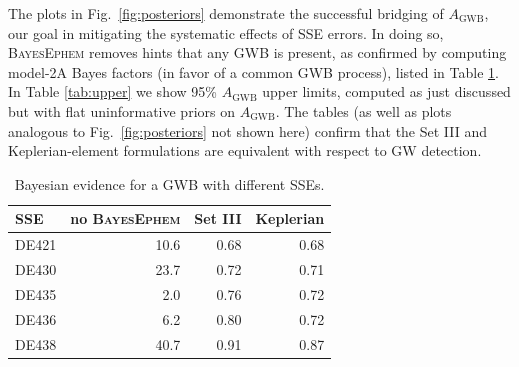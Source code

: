 \documentclass[iop,apj,twocolappendix]{emulateapj}
\begin{document}
The plots in Fig.\ \ref{fig:posteriors} demonstrate the successful bridging of $A_\mathrm{GWB}$, our goal in mitigating the systematic effects of SSE errors. In doing so, \textsc{BayesEphem} removes hints that any GWB is present, as confirmed by computing model-2A Bayes factors (in favor of a common GWB process), listed in Table \ref{tab:bf}. In Table \ref{tab:upper} we show 95\% $A_\mathrm{GWB}$ upper limits, computed as just discussed but with flat uninformative priors on $A_\mathrm{GWB}$. The tables (as well as plots analogous to Fig.\ \ref{fig:posteriors} not shown here) confirm that the Set III and Keplerian-element formulations are equivalent with respect to GW detection.
%
\begin{table}[ht]
    \begin{center}
    \caption{Bayesian evidence for a GWB with different SSEs.\label{tab:bf}} 
    \begin{tabular}{l|r|r|r}
SSE & no \textsc{BayesEphem} & Set III & Keplerian \\
\hline
DE421 & 10.6 & 0.68 & 0.68 \\
DE430 & 23.7 & 0.72 & 0.71 \\
DE435 &  2.0 & 0.76 & 0.72 \\
DE436 &  6.2 & 0.80 & 0.72 \\
DE438 & 40.7 & 0.91 & 0.87
    \end{tabular}
\end{center}
\end{table}
%
\end{document}
